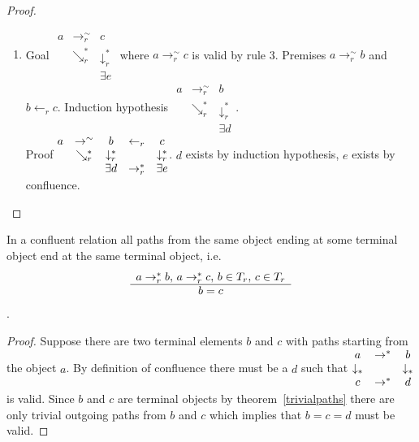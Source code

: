 \begin{theorem}
\begin{proof}
\begin{enumerate}
    \item
      Goal
      $\begin{matrix}
        a    & \to_r^\sim      & c                      \\
              & \searrow_r^* & \downarrow_r^*  \\
        & & \exists e
      \end{matrix}$
      where $a \to_r^\sim c$ is valid by rule 3. Premises $a \to_r^\sim b$
      and $b \gets_r c$.
      Induction hypothesis
      $\begin{matrix}
        a    & \to_r^\sim      & b                      \\
              & \searrow_r^* & \downarrow_r^*  \\
        & & \exists d
      \end{matrix}$.\\
      Proof
      $\begin{matrix}
        a & \to^\sim & b & \gets_r & c\\
        & \searrow_r^* & \downarrow_r^*  & & \downarrow_r^*\\
        & & \exists d & \to_r^* & \exists e
      \end{matrix}$.
      $d$ exists by induction hypothesis, $e$ exists by confluence.
    \end{enumerate}
  \end{proof}
\end{theorem}


\begin{theorem}
  In a confluent relation all paths from the same object ending at some terminal
  object end at the same terminal object, i.e.
  $$\begin{array}{c} a \to_r^* b, \, a \to_r^* c, \, b \in T_r, \, c \in T_r \\ \hline b = c\end{array}$$.

  \begin{proof}
    Suppose there are two terminal elements $b$ and $c$ with paths starting
    from the object $a$.
    By definition of confluence there must be a $d$ such that
    $\begin{matrix} a & \to^* & b \\
      \downarrow_* & & \downarrow_* \\
      c & \to^* & d
    \end{matrix}$ is valid. Since $b$ and $c$ are terminal objects by
    theorem~\ref{trivialpaths} there are only trivial outgoing paths from $b$
    and $c$ which implies that $b = c = d$ must be valid.
  \end{proof}
\end{theorem}


